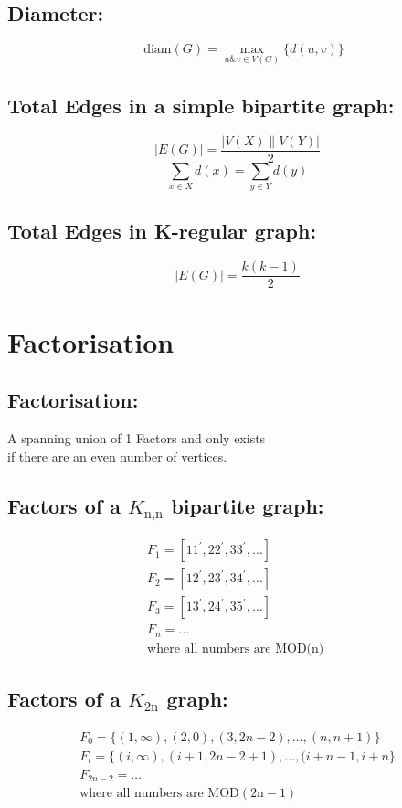 \subsection{Diameter:}
\[\quad \text{diam}(G)=\max _{u \& v \in V(G)}\{d(u, v)\}\]
%
\subsection{Total Edges in a simple bipartite graph:}
\[|E(G)|=\frac{|V(X) \| V(Y)|}{2} \]
\[\sum_{x \in X} d(x)=\sum_{y \in Y} d(y)\]
%
\subsection{Total Edges in K-regular graph:}
\[|E(G)|=\frac{k(k-1)}{2}\]
%
\section{Factorisation}
%
\subsection{Factorisation:}
\begin{center}
A spanning union of 1 Factors and only exists\\ if there are an even number of vertices.
\end{center}
%
\subsection{Factors of a $K_\text{n,n}$ bipartite graph:}
\[
\begin{array}{l}
F_{1}=\left[11^{\prime}, 22^{\prime}, 33^{\prime}, \ldots\right]\\
F_{2}=\left[12^{\prime}, 23^{\prime}, 34^{\prime}, \ldots\right]\\
F_{3}=\left[13^{\prime}, 24^{\prime}, 35^{\prime}, \ldots\right]\\
F_{n}=\ldots\\
\text{where all numbers are MOD(n) }
\end{array}
\]
%
\subsection{Factors of a $K_\text{2n}$ graph:}
\[
\begin{array}{l}
F_{0}=\{(1, \infty),(2,0),(3,2 n-2), \ldots,(n, n+1)\}\\
F_{i}=\{(i, \infty),(i+1,2 n-2+1), \ldots,(i+n-1, i+n\}\\
F_{2 n-2}=\ldots\\
\text{where all numbers are } \mathrm{MOD}(2 \mathrm{n}-1)
\end{array}
\]
%
%
